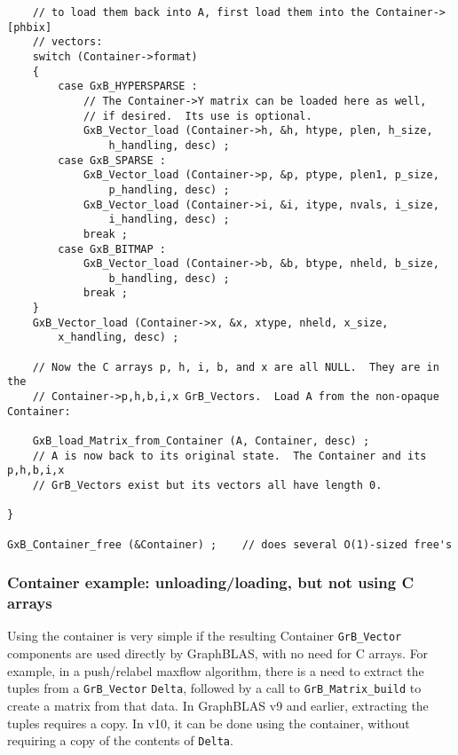 {\begin{verbatim}
    // to load them back into A, first load them into the Container->[phbix]
    // vectors:
    switch (Container->format)
    {
        case GxB_HYPERSPARSE :
            // The Container->Y matrix can be loaded here as well,
            // if desired.  Its use is optional.
            GxB_Vector_load (Container->h, &h, htype, plen, h_size,
                h_handling, desc) ;
        case GxB_SPARSE :
            GxB_Vector_load (Container->p, &p, ptype, plen1, p_size,
                p_handling, desc) ;
            GxB_Vector_load (Container->i, &i, itype, nvals, i_size,
                i_handling, desc) ;
            break ;
        case GxB_BITMAP :
            GxB_Vector_load (Container->b, &b, btype, nheld, b_size,
                b_handling, desc) ;
            break ;
    }
    GxB_Vector_load (Container->x, &x, xtype, nheld, x_size,
        x_handling, desc) ;

    // Now the C arrays p, h, i, b, and x are all NULL.  They are in the
    // Container->p,h,b,i,x GrB_Vectors.  Load A from the non-opaque Container:

    GxB_load_Matrix_from_Container (A, Container, desc) ;
    // A is now back to its original state.  The Container and its p,h,b,i,x
    // GrB_Vectors exist but its vectors all have length 0.

}

GxB_Container_free (&Container) ;    // does several O(1)-sized free's
\end{verbatim}}

\subsubsection{Container example: unloading/loading, but not using C arrays}
\label{container_example2}

Using the container is very simple if the resulting Container \verb'GrB_Vector'
components are used directly by GraphBLAS, with no need for C arrays.  For
example, in a push/relabel maxflow algorithm, there is a need to extract the
tuples from a \verb'GrB_Vector' \verb'Delta', followed by a call to
\verb'GrB_Matrix_build' to create a matrix from that data.  In GraphBLAS v9 and
earlier, extracting the tuples requires a copy.  In v10, it can be done using
the container, without requiring a copy of the contents of \verb'Delta'.

